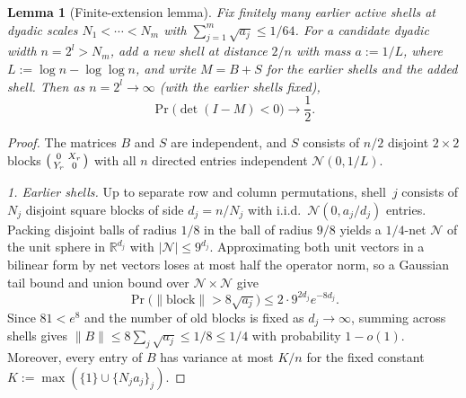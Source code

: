 \documentclass[11pt]{article}
\theoremstyle{plain}
\newtheorem{lemma}[theorem]{Lemma}
\theoremstyle{definition}
\theoremstyle{remark}
\begin{document}
\begin{lemma}[Finite-extension lemma]\label{lem:extension}
Fix finitely many earlier active shells at dyadic scales $N_1 < \cdots < N_m$ with $\sum_{j=1}^m \sqrt{a_j} \le 1/64$. For a candidate dyadic width $n = 2^l > N_m$, add a new shell at distance $2/n$ with mass $a := 1/L$, where $L := \log n - \log\log n$, and write $M = B + S$ for the earlier shells and the added shell. Then as $n = 2^l \to \infty$ (with the earlier shells fixed),
\[
\Pr\bigl(\det(I - M) < 0\bigr) \longrightarrow \frac{1}{2}.
\]
\end{lemma}

\begin{proof}
The matrices $B$ and $S$ are independent, and $S$ consists of $n/2$ disjoint $2 \times 2$ blocks $\begin{psmallmatrix} 0 & X_r \\ Y_r & 0 \end{psmallmatrix}$ with all $n$ directed entries independent $\mathcal{N}(0, 1/L)$.

\emph{1. Earlier shells.}
Up to separate row and column permutations, shell~$j$ consists of $N_j$ disjoint square blocks of side $d_j = n/N_j$ with i.i.d.\ $\mathcal{N}(0, a_j/d_j)$ entries. Packing disjoint balls of radius $1/8$ in the ball of radius $9/8$ yields a $1/4$-net $\mathcal{N}$ of the unit sphere in $\mathbb{R}^{d_j}$ with $|\mathcal{N}| \le 9^{d_j}$. Approximating both unit vectors in a bilinear form by net vectors loses at most half the operator norm, so a Gaussian tail bound and union bound over $\mathcal{N} \times \mathcal{N}$ give
\[
\Pr\bigl(\|\text{block}\| > 8\sqrt{a_j}\bigr) \le 2 \cdot 9^{2 d_j} e^{-8 d_j}.
\]
Since $81 < e^8$ and the number of old blocks is fixed as $d_j \to \infty$, summing across shells gives $\|B\| \le 8\sum_j \sqrt{a_j} \le 1/8 \le 1/4$ with probability $1 - o(1)$. Moreover, every entry of $B$ has variance at most $K/n$ for the fixed constant $K := \max(\{1\} \cup \{N_j a_j\}_j)$.


\end{proof}
\end{document}

